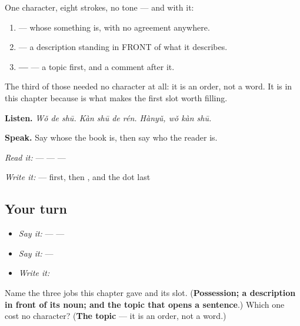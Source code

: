 \begin{grammarlens}[title={What you've built — the hinge}]
One character, eight strokes, no tone — and with it:

\begin{enumerate}
\raggedright
  \item \textbf{} — whose something is, with no agreement anywhere.
  \item \textbf{} — a description standing in FRONT of what it describes.
  \item \textbf{ — } — a topic first, and a comment after it.
\end{enumerate}

The third of those needed no character at all: it is an order, not a word. It is in this chapter because  is what makes the first slot worth filling.

\textbf{Listen.} \emph{Wǒ de shū. Kàn shū de rén. Hànyǔ, wǒ kàn shū.}

\textbf{Speak.} Say whose the book is, then say who the reader is.

\emph{Read it:}  —  —  — 

\emph{Write it:}  —  first, then , and the dot last
\end{grammarlens}

\subsection*{Your turn}
\begin{itemize}
\raggedright
  \item \emph{Say it:}  —  — 
  \item \emph{Say it:}  — 
  \item \emph{Write it:} 
\end{itemize}

\begin{tcolorbox}[breakable,colback=teal!4,colframe=teal!35!black,title={Before you move on}]
Name the three jobs this chapter gave  and its slot. (\textbf{Possession; a description in front of its noun; and the topic that opens a sentence}.) Which one cost no character? (\textbf{The topic} — it is an order, not a word.)
\end{tcolorbox}
